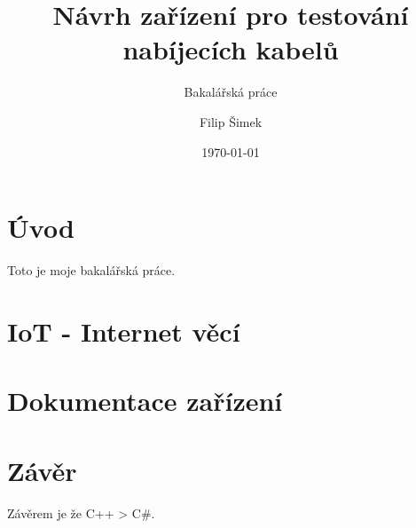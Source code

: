 \documentclass[12pt,a4paper,titlepage]{scrartcl}
\title{\vspace{6cm}Návrh zařízení pro testování nabíjecích kabelů}
\subtitle{Bakalářská práce}
\author{Filip Šimek}
\date{\today}
\begin{document}
%

	\maketitle 

	\tableofcontents
	\newpage
	
	
	
	\section {Úvod}
	Toto je moje bakalářská práce.
	
	\section{IoT - Internet věcí}
	
	
	\section{Dokumentace zařízení}
	
	 \section*{Závěr}
	Závěrem je že C++ > C\#.

	\newpage
	\listoffigures
	\listoftables
	\lstlistoflistings
\end{document}
